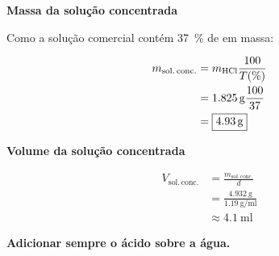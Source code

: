 \documentclass[a4paper,12pt]{article}
\newcommand{\subtitulo}[1]{%
  \par\medskip
  {\color{quadroazul}\bfseries\large #1}\par\smallskip
}
\begin{document}
\subtitulo{Massa da solução concentrada}

Como a solução comercial contém \qty{37}{\percent} de  em massa:

\begin{align*}
  m_{\mathrm{sol.\,conc.}}
    &= m_{\ce{HCl}}\frac{100}{T(\%)} \\
    &= \qty{1.825}{\gram}\frac{100}{37} \\
    &= \boxed{\qty{4.93}{\gram}}
\end{align*}

\subtitulo{Volume da solução concentrada}

\begin{align*}
  V_{\mathrm{sol.\,conc.}}
    &= \frac{m_{\mathrm{sol.\,conc.}}}{d} \\
    &= \frac{\qty{4.932}{\gram}}
             {\qty{1.19}{\gram\per\milli\litre}} \\
    &\approx \boxed{\qty{4.1}{\milli\litre}}
\end{align*}

\vspace{0.5cm}

\begin{tcolorbox}[
  colback=quadrovermelho!6,
  colframe=quadrovermelho,
  boxrule=1pt,
  arc=2mm
]
\centering
{\color{quadrovermelho}\bfseries\Large Adicionar sempre o ácido sobre a água.}
\end{tcolorbox}
\end{document}
